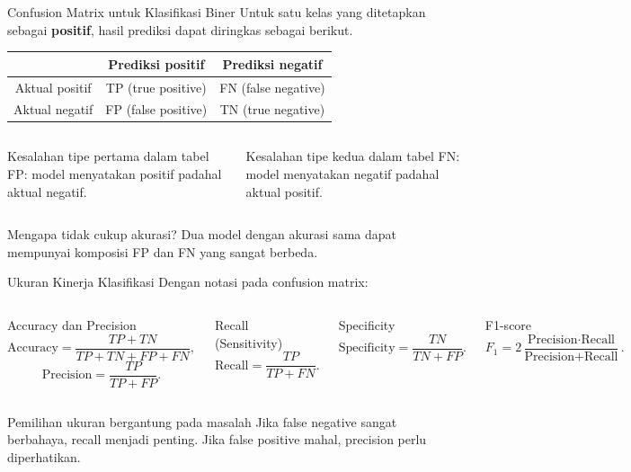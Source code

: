 \documentclass[aspectratio=169,11pt]{beamer}
\begin{document}
\begin{frame}{Confusion Matrix untuk Klasifikasi Biner}
\small
Untuk satu kelas yang ditetapkan sebagai \textbf{positif}, hasil prediksi dapat diringkas sebagai berikut.
\begin{center}
\begin{tabular}{c|cc}
 & Prediksi positif & Prediksi negatif \\
\hline
Aktual positif & TP (true positive) & FN (false negative) \\
Aktual negatif & FP (false positive) & TN (true negative)
\end{tabular}
\end{center}
\vspace{2mm}
\begin{columns}[T]
\begin{block}{Kesalahan tipe pertama dalam tabel}
\small
FP: model menyatakan positif padahal aktual negatif.
\end{block}
\begin{block}{Kesalahan tipe kedua dalam tabel}
\small
FN: model menyatakan negatif padahal aktual positif.
\end{block}
\end{columns}
\begin{alertblock}{Mengapa tidak cukup akurasi?}
\small
Dua model dengan akurasi sama dapat mempunyai komposisi FP dan FN yang sangat berbeda.
\end{alertblock}
\end{frame}

\begin{frame}{Ukuran Kinerja Klasifikasi}
\small
Dengan notasi pada confusion matrix:
\begin{columns}[T]
\begin{block}{Accuracy dan Precision}
\[
\text{Accuracy}=\frac{TP+TN}{TP+TN+FP+FN},
\]
\[
\text{Precision}=\frac{TP}{TP+FP}.
\]
\end{block}
\begin{block}{Recall (Sensitivity)}
\[
\text{Recall}=\frac{TP}{TP+FN}.
\]
\end{block}
\begin{block}{Specificity}
\[
\text{Specificity}=\frac{TN}{TN+FP}.
\]
\end{block}
\begin{block}{F1-score}
\[
F_1=2\frac{\text{Precision}\cdot\text{Recall}}
{\text{Precision}+\text{Recall}}.
\]
\end{block}
\end{columns}
\begin{alertblock}{Pemilihan ukuran bergantung pada masalah}
\footnotesize
Jika false negative sangat berbahaya, recall menjadi penting. Jika false positive mahal, precision perlu diperhatikan.
\end{alertblock}
\end{frame}
\end{document}
